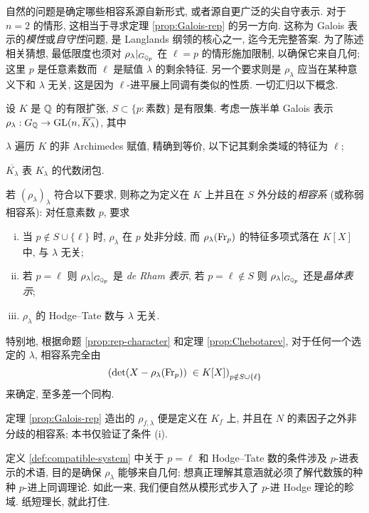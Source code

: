 自然的问题是确定哪些相容系源自新形式, 或者源自更广泛的尖自守表示. 对于 $n=2$ 的情形, 这相当于寻求定理 \ref{prop:Galois-rep} 的另一方向. 这称为 Galois 表示的\emph{模性}或\emph{自守性}问题, 是 Langlands 纲领的核心之一, 迄今无完整答案. 为了陈述相关猜想, 最低限度也须对 $\rho_\lambda|_{G_{\mathbb{Q}_p}}$ 在 $\ell = p$ 的情形施加限制, 以确保它来自几何; 这里 $p$ 是任意素数而 $\ell$ 是赋值 $\lambda$ 的剩余特征. 另一个要求则是 $\rho_\lambda$ 应当在某种意义下和 $\lambda$ 无关, 这是因为 $\ell$-进平展上同调有类似的性质. 一切汇归以下概念.

\begin{definition}\label{def:compatible-system} 
	设 $K$ 是 $\mathbb{Q}$ 的有限扩张, $S \subset \{p: \text{素数}\}$ 是有限集. 考虑一族半单 Galois 表示 $\rho_\lambda: G_{\mathbb{Q}} \to \operatorname{GL}(n, \overline{K_\lambda})$, 其中
	\begin{compactitem}
		\item $\lambda$ 遍历 $K$ 的非 Archimedes 赋值, 精确到等价, 以下记其剩余类域的特征为 $\ell$;
		\item $\overline{K_\lambda}$ 表 $K_\lambda$ 的代数闭包.
	\end{compactitem}

	若 $(\rho_\lambda)_\lambda$ 符合以下要求, 则称之为定义在 $K$ 上并且在 $S$ 外分歧的\emph{相容系} (或称弱相容系): 对任意素数 $p$, 要求
	\begin{enumerate}[(i)]
		\item 当 $p \notin S \cup \{\ell\}$ 时, $\rho_\lambda$ 在 $p$ 处非分歧, 而 $\rho_\lambda(\operatorname{Fr}_p)$ 的特征多项式落在 $K[X]$ 中, 与 $\lambda$ 无关;
		\item 若 $p = \ell$ 则 $\rho_\lambda |_{G_{\mathbb{Q}_p}}$ 是 \emph{de Rham 表示}, 若 $p = \ell \notin S$ 则 $\rho_\lambda |_{G_{\mathbb{Q}_p}}$ 还是\emph{晶体表示};
		\item $\rho_\lambda$ 的 Hodge--Tate 数与 $\lambda$ 无关. 
	\end{enumerate}
\end{definition}
特别地, 根据命题 \ref{prop:rep-character} 和定理 \ref{prop:Chebotarev}, 对于任何一个选定的 $\lambda$, 相容系完全由
\[ \left( \det(X - \rho_\lambda(\operatorname{Fr}_p)) \; \in K[X] \right)_{p \notin S \cup \{\ell\} } \]
来确定, 至多差一个同构.

\begin{example}
	定理 \ref{prop:Galois-rep} 造出的 $\rho_{f, \lambda}$ 便是定义在 $K_f$ 上, 并且在 $N$ 的素因子之外非分歧的相容系; 本书仅验证了条件 (i).
\end{example}

定义 \ref{def:compatible-system} 中关于 $p = \ell$ 和 Hodge--Tate 数的条件涉及 $p$-进表示的术语, 目的是确保 $\rho_\lambda$ 能够来自几何; 想真正理解其意涵就必须了解代数簇的种种 $p$-进上同调理论. 如此一来, 我们便自然从模形式步入了 $p$-进 Hodge 理论的畛域. 纸短理长, 就此打住.
